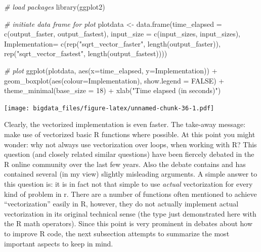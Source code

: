 \documentclass[
  12pt,
]{style/krantz}
\newenvironment{Shaded}{\begin{snugshade}}{\end{snugshade}}
\newcommand{\AttributeTok}[1]{\textcolor[rgb]{0.77,0.63,0.00}{#1}}
\newcommand{\CommentTok}[1]{\textcolor[rgb]{0.56,0.35,0.01}{\textit{#1}}}
\newcommand{\ConstantTok}[1]{\textcolor[rgb]{0.00,0.00,0.00}{#1}}
\newcommand{\DecValTok}[1]{\textcolor[rgb]{0.00,0.00,0.81}{#1}}
\newcommand{\FunctionTok}[1]{\textcolor[rgb]{0.00,0.00,0.00}{#1}}
\newcommand{\NormalTok}[1]{#1}
\newcommand{\OtherTok}[1]{\textcolor[rgb]{0.56,0.35,0.01}{#1}}
\newcommand{\SpecialCharTok}[1]{\textcolor[rgb]{0.00,0.00,0.00}{#1}}
\newcommand{\StringTok}[1]{\textcolor[rgb]{0.31,0.60,0.02}{#1}}
\begin{document}
\begin{Shaded}
\begin{Highlighting}[]
\CommentTok{\# load packages}
\FunctionTok{library}\NormalTok{(ggplot2)}

\CommentTok{\# initiate data frame for plot}
\NormalTok{plotdata }\OtherTok{\textless{}{-}} \FunctionTok{data.frame}\NormalTok{(}\AttributeTok{time\_elapsed =} \FunctionTok{c}\NormalTok{(output\_faster, output\_fastest),}
                       \AttributeTok{input\_size =} \FunctionTok{c}\NormalTok{(input\_sizes, input\_sizes),}
                       \AttributeTok{Implementation=} \FunctionTok{c}\NormalTok{(}\FunctionTok{rep}\NormalTok{(}\StringTok{"sqrt\_vector\_faster"}\NormalTok{, }\FunctionTok{length}\NormalTok{(output\_faster)),}
                            \FunctionTok{rep}\NormalTok{(}\StringTok{"sqrt\_vector\_fastest"}\NormalTok{, }\FunctionTok{length}\NormalTok{(output\_fastest))))}

\CommentTok{\# plot}
\FunctionTok{ggplot}\NormalTok{(plotdata, }\FunctionTok{aes}\NormalTok{(}\AttributeTok{x=}\NormalTok{time\_elapsed, }\AttributeTok{y=}\NormalTok{Implementation)) }\SpecialCharTok{+}
     \FunctionTok{geom\_boxplot}\NormalTok{(}\FunctionTok{aes}\NormalTok{(}\AttributeTok{colour=}\NormalTok{Implementation),}
                          \AttributeTok{show.legend =} \ConstantTok{FALSE}\NormalTok{) }\SpecialCharTok{+}
     \FunctionTok{theme\_minimal}\NormalTok{(}\AttributeTok{base\_size =} \DecValTok{18}\NormalTok{) }\SpecialCharTok{+}
     \FunctionTok{xlab}\NormalTok{(}\StringTok{"Time elapsed (in seconds)"}\NormalTok{)}
\end{Highlighting}
\end{Shaded}

\texttt{[image: bigdata\_files/figure-latex/unnamed-chunk-36-1.pdf]}

Clearly, the vectorized implementation is even faster. The take-away message: make use of vectorized basic R functions where possible. At this point you might wonder: why not always use vectorization over loops, when working with R? This question (and closely related similar questions) have been fiercely debated in the R online community over the last few years. Also the debate contains and has contained several (in my view) slightly misleading arguments. A simple answer to this question is: it is in fact not that simple to use \emph{actual} vectorization for every kind of problem in r. There are a number of functions often mentioned to achieve ``vectorization'' easily in R, however, they do not actually implement actual vectorization in its original technical sense (the type just demonstrated here with the R math operators). Since this point is very prominent in debates about how to improve R code, the next subsection attempts to summarize the most important aspects to keep in mind.
\end{document}
